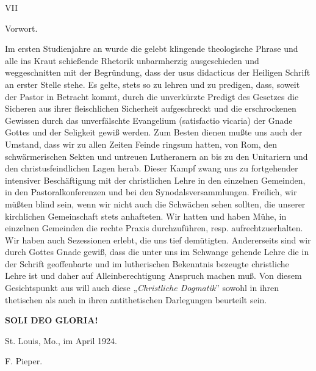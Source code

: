 \hfill\small VII\begin{center}\small Vorwort.\end{center}\noindent Im ersten Studienjahre an wurde die gelebt klingende theologische Phrase und alle ins Kraut schießende Rhetorik unbarmherzig ausgeschieden und weggeschnitten mit der Begründung, dass der usus didacticus der Heiligen Schrift an erster Stelle stehe. Es gelte, stets so zu lehren und zu predigen, dass, soweit der Pastor in Betracht kommt, durch die unverkürzte Predigt des Gesetzes die Sicheren aus ihrer fleischlichen Sicherheit aufgeschreckt und die erschrockenen Gewissen durch das unverfälschte Evangelium (satisfactio vicaria) der Gnade Gottes und der Seligkeit gewiß werden. Zum Besten dienen mußte uns auch der Umstand, dass wir zu allen Zeiten Feinde ringsum hatten, von Rom, den schwärmerischen Sekten und untreuen Lutheranern an bis zu den Unitariern und den christusfeindlichen Lagen herab. Dieser Kampf zwang uns zu fortgehender intensiver Beschäftigung mit der christlichen Lehre in den einzelnen Gemeinden, in den Pastoralkonferenzen und bei den Synodalsversammlungen. Freilich, wir müßten blind sein, wenn wir nicht auch die Schwächen sehen sollten, die unserer kirchlichen Gemeinschaft stets anhafteten. Wir hatten und haben Mühe, in einzelnen Gemeinden die rechte Praxis durchzuführen, resp. aufrechtzuerhalten. Wir haben auch Sezessionen erlebt, die uns tief demütigten. Andererseits sind wir durch Gottes Gnade gewiß, dass die unter uns im Schwange gehende Lehre die in der Schrift geoffenbarte und im lutherischen Bekenntnis bezeugte christliche Lehre ist und daher auf Alleinberechtigung Anspruch machen muß. Von diesem Gesichtspunkt aus will auch diese „\textit{Christliche Dogmatik}” sowohl in ihren thetischen als auch in ihren antithetischen Darlegungen beurteilt sein.\vspace{\baselineskip}\begin{center}\textbf{SOLI DEO GLORIA!}\end{center}\vspace{\baselineskip}\begin{flushleft}St. Louis, Mo., im April 1924.\end{flushleft}\begin{flushright}F. Pieper.\end{flushright}